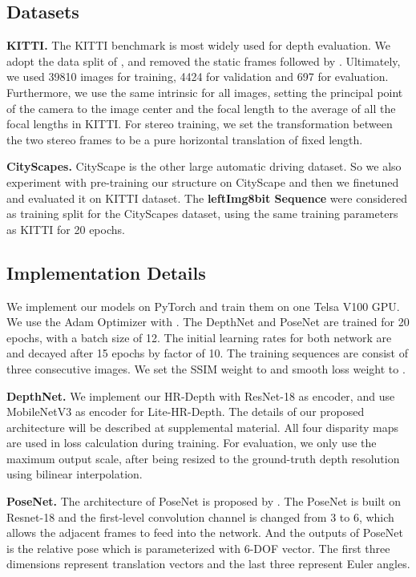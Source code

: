 \documentclass[letterpaper]{article} \usepackage{aaai21}  \usepackage{times}  \usepackage{helvet} \usepackage{courier}  \usepackage[hyphens]{url}  \usepackage{graphicx} \urlstyle{rm} \def\UrlFont{\rm}  \usepackage{natbib}  \usepackage{caption} \frenchspacing  \setlength{\pdfpagewidth}{8.5in}  \setlength{\pdfpageheight}{11in}  \usepackage{booktabs}
\begin{document}
\subsection{Datasets}
\textbf{KITTI.} The KITTI benchmark \cite{geiger2013vision} is most widely used for depth evaluation. 
We adopt the data split of \cite{eigen2015predicting}, and removed the static frames followed by \cite{zhou2017unsupervised}. Ultimately, we used 39810 images for training, 4424 for validation and 697 for evaluation. 
Furthermore, we use the same intrinsic for all images, setting the principal point of the camera to the image center and the focal length to the average of all the focal lengths in KITTI. For stereo training, we set the transformation
between the two stereo frames to be a pure horizontal translation of fixed length.

\noindent\textbf{CityScapes.} CityScape \cite{Cordts2016Cityscapes} is the other large automatic driving dataset. So we also experiment with pre-training our structure on CityScape and then we finetuned and evaluated it on KITTI dataset. 
The \textbf{leftImg8bit Sequence} were considered as training split for the CityScapes dataset, using the same training parameters as KITTI for 20 epochs.

\subsection{Implementation Details}
We implement our models on PyTorch\cite{paszke2017automatic} and train them on one Telsa V100 GPU. We use the Adam Optimizer\cite{kingma2014adam} with . The DepthNet and PoseNet are 
trained for 20 epochs, with a batch size of 12. The initial learning rates for both network are  and decayed after 15 epochs by factor of 10. The training sequences are consist of three consecutive 
images. We set the SSIM weight to  and smooth loss weight to .

\noindent\textbf{DepthNet.} We implement our HR-Depth with ResNet-18\cite{Resnet} as encoder, and use MobileNetV3\cite{howard2019searching} as encoder for Lite-HR-Depth. The details of our proposed architecture will be described at supplemental material. 
All four disparity maps are used in loss calculation during training. For evaluation, we only use the maximum output scale, after being resized to the ground-truth depth resolution using bilinear interpolation. 

\noindent\textbf{PoseNet.} The architecture of PoseNet is proposed by \cite{godard2019digging}. The PoseNet is built on Resnet-18 and the first-level convolution channel is changed from 3 to 6, which allows the adjacent frames to feed into the network. 
And the outputs of PoseNet is the relative pose which is parameterized with 6-DOF vector. The first three dimensions represent translation vectors and the last three represent Euler angles.
\end{document}
